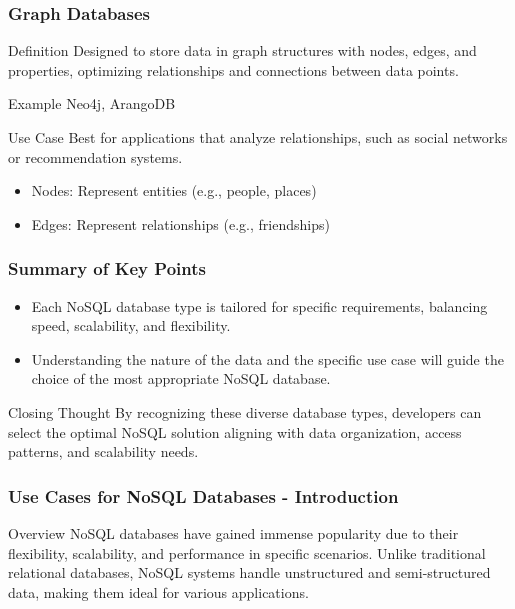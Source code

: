 \documentclass[aspectratio=169]{beamer}
\begin{document}
\begin{frame}
    \frametitle{Graph Databases}
    \begin{block}{Definition}
        Designed to store data in graph structures with nodes, edges, and properties, optimizing relationships and connections between data points.
    \end{block}
    
    \begin{block}{Example}
        Neo4j, ArangoDB
    \end{block}
    
    \begin{block}{Use Case}
        Best for applications that analyze relationships, such as social networks or recommendation systems.
    \end{block}
    
    \begin{itemize}
        \item Nodes: Represent entities (e.g., people, places)
        \item Edges: Represent relationships (e.g., friendships)
    \end{itemize}
\end{frame}

\begin{frame}
    \frametitle{Summary of Key Points}
    \begin{itemize}
        \item Each NoSQL database type is tailored for specific requirements, balancing speed, scalability, and flexibility.
        \item Understanding the nature of the data and the specific use case will guide the choice of the most appropriate NoSQL database.
    \end{itemize}
    
    \begin{block}{Closing Thought}
        By recognizing these diverse database types, developers can select the optimal NoSQL solution aligning with data organization, access patterns, and scalability needs.
    \end{block}
\end{frame}

\begin{frame}[fragile]
    \frametitle{Use Cases for NoSQL Databases - Introduction}
    \begin{block}{Overview}
        NoSQL databases have gained immense popularity due to their flexibility, scalability, and performance in specific scenarios. 
        Unlike traditional relational databases, NoSQL systems handle unstructured and semi-structured data, making them ideal for various applications.
    \end{block}
\end{frame}
\end{document}
